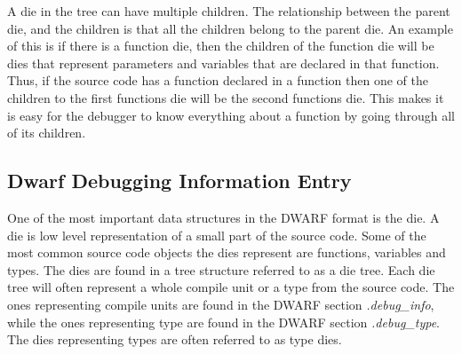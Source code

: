 A \gls{die} in the tree can have multiple children.
The relationship between the parent \gls{die}, and the children is that all the children belong to the parent \gls{die}.
An example of this is if there is a function \gls{die}, then the children of the function \gls{die} will be \glspl{die} that represent parameters and variables that are declared in that function.
Thus, if the source code has a function declared in a function then one of the children to the first functions \gls{die} will be the second functions \gls{die}.
This makes it is easy for the debugger to know everything about a function by going through all of its children.



\subsection{Dwarf Debugging Information Entry}
 


One of the most important data structures in the \gls{DWARF} format is the \gls{die}.
A \gls{die} is low level representation of a small part of the source code.
Some of the most common source code objects the \glspl{die} represent are functions, variables and types.
The \glspl{die} are found in a tree structure referred to as a \gls{die} tree.
Each \gls{die} tree will often represent a whole compile unit or a type from the source code.
The ones representing compile units are found in the \gls{DWARF} section \emph{.debug\_info}, while the ones representing type are found in the \gls{DWARF} section \emph{.debug\_type}.
The \glspl{die} representing types are often referred to as type \glspl{die}.


